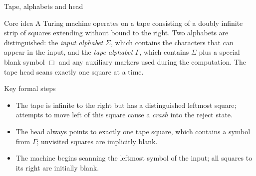 \begin{frame}[t]{Tape, alphabets and head}
  \begin{tblock}{Core idea}
    A Turing machine operates on a tape consisting of a doubly infinite
    strip of squares extending without bound to the right.  Two
    alphabets are distinguished: the \emph{input alphabet} $\Sigma$, which
    contains the characters that can appear in the input, and the
    \emph{tape alphabet} $\Gamma$, which contains $\Sigma$ plus a special
    blank symbol $\Box$ and any auxiliary markers used during the
    computation.  The tape head scans exactly one square at a time.
  \end{tblock}
  \begin{tblock}{Key formal steps}
    \begin{itemize}
      \item The tape is infinite to the right but has a distinguished
        leftmost square; attempts to move left of this square cause a
        \emph{crash} into the reject state.
      \item The head always points to exactly one tape square, which
        contains a symbol from $\Gamma$; unvisited squares are implicitly
        blank.
      \item The machine begins scanning the leftmost symbol of the
        input; all squares to its right are initially blank.
    \end{itemize}
  \end{tblock}
  \label{fr:7.1-05}
\end{frame}

